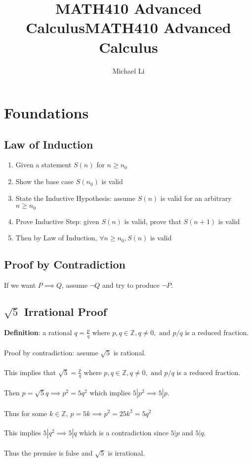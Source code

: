 \documentclass{article}
\date{}
\title{MATH410 Advanced Calculus}
\begin{document}
 
  \author{Michael Li}
  \title{MATH410 Advanced Calculus}
  \maketitle
  \tableofcontents
  \newpage
  \section{Foundations} 
  \subsection{Law of Induction}
  \begin{enumerate}
    \item Given a statement $S(n)$ for $n \geq n_0$
    \item Show the base case $S(n_0)$ is valid
    \item State the Inductive Hypothesis: assume $S(n)$ is valid for an arbitrary $n \geq n_0$
    \item Prove Inductive Step: given $S(n)$ is valid, prove that $S(n+1)$ is valid
    \item Then by Law of Induction, $\forall n \geq n_0, S(n)$ is valid
  \end{enumerate}
  \subsection{Proof by Contradiction}
  If we want $P \implies Q$, assume $\neg Q$ and try to produce $\neg P$.
  \subsection{$\sqrt{5}$ Irrational Proof}
  \textbf{Definition}: a rational $q = \frac{p}{q}$ where $p, q \in \mathbb{Z}, q \neq 0, \text{ and } p/q$ is a reduced fraction. \\ \\
  Proof by contradiction: assume $\sqrt{5}$ is rational. \\ \\
  This implies that $\sqrt{5} = \frac{p}{q}$ where $p, q \in \mathbb{Z}, q \neq 0, \text{ and } p/q$ is a reduced fraction. \\ \\
  Then $p = \sqrt{5}q \implies p^2 = 5q^2$ which implies $5 | p^2 \implies 5|p$. \\ \\
  Thus for some $k \in \mathbb{Z}$, $p = 5k \implies p^2 = 25k^2 = 5q^2$ \\ \\
  This implies $5 |q^2 \implies 5|q$ which is a contradiction since $5|p$ and $5|q$. \\ \\
  Thus the premise is false and $\sqrt{5}$ is irrational.
\end{document}
